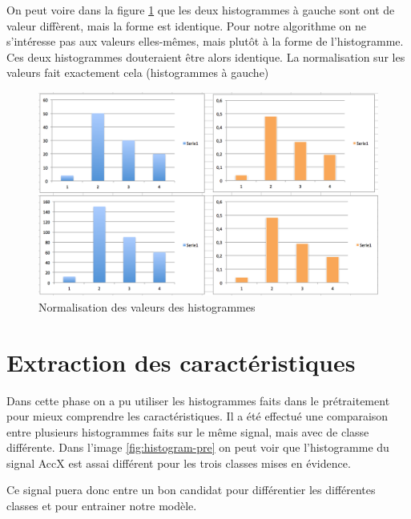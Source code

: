 On peut voire dans la figure \ref{fig:normalization} que les deux histogrammes à gauche sont ont de valeur diffèrent, mais la forme est identique. Pour notre algorithme on ne s’intéresse pas aux valeurs elles-mêmes, mais plutôt à la forme de l'histogramme. Ces deux histogrammes douteraient être alors identique. La normalisation sur les valeurs fait exactement cela (histogrammes à gauche)

\begin{figure}[h]
  \centering
    \includegraphics[width=0.8\linewidth]{img/pretraitement/normalization.png}
  \caption{Normalisation des valeurs des histogrammes}
  \label{fig:normalization}
\end{figure}


\section*{Extraction des caractéristiques}
Dans cette phase on a pu utiliser les histogrammes faits dans le prétraitement pour mieux comprendre les caractéristiques. Il a été effectué une comparaison entre plusieurs histogrammes faits sur le même signal, mais avec de classe différente. Dans l'image \ref{fig:histogram-pre} on peut voir que l'histogramme du signal AccX est assai différent pour les trois classes mises en évidence.

Ce signal puera donc entre un bon candidat pour différentier les différentes classes et pour entrainer notre modèle. 


